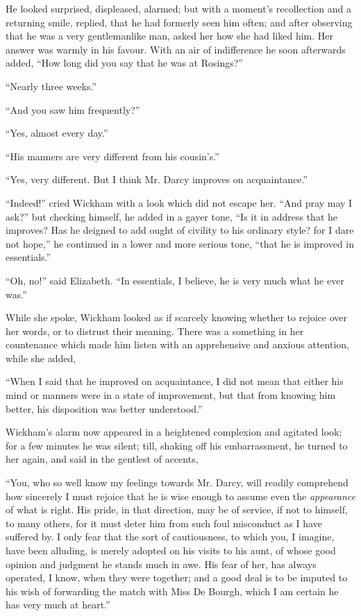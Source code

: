 He looked surprised, displeased, alarmed; but with
a moment’s recollection and a returning smile, replied,
that he had formerly seen him often; and after observing
that he was a very gentlemanlike man, asked her how she
had liked him. Her answer was warmly in his favour.
With an air of indifference he soon afterwards added,
“How long did you say that he was at Rosings?”

“Nearly three weeks.”

“And you saw him frequently?”

“Yes, almost every day.”

“His manners are very different from his cou\-sin’s.”

“Yes, very different. But I think Mr. Darcy improves
on acquaintance.”

“Indeed!” cried Wickham with a look which did not
escape her. “And pray may I ask?” but checking himself,
he added in a gayer tone, “Is it in address that he
improves? Has he deigned to add ought of civility to
his ordinary style? for I dare not hope,” he continued
in a lower and more serious tone, “that he is improved
in essentials.”

“Oh, no!” said Elizabeth. “In essentials, I believe,
he is very much what he ever was.”

While she spoke, Wickham looked as if scarcely knowing
whether to rejoice over her words, or to distrust their
meaning. There was a something in her countenance
which made him listen with an apprehensive and anxious
attention, while she added,

“When I said that he improved on acquaintance, I did
not mean that either his mind or manners were in a state
of improvement, but that from knowing him better, his
disposition was better understood.”

Wickham’s alarm now appeared in a heightened complexion
and agitated look; for a few minutes he was
silent; till, shaking off his embarrassment, he turned to
her again, and said in the gentlest of accents,

“You, who so well know my feelings towards Mr. Darcy,
will readily comprehend how sincerely I must rejoice that
he is wise enough to assume even the \textit{appearance} of what
is right. His pride, in that direction, may be of service,
if not to himself, to many others, for it must deter him
from such foul misconduct as I have suffered by. I only
fear that the sort of cautiousness, to which you, I imagine,
have been alluding, is merely adopted on his visits to his
aunt, of whose good opinion and judgment he stands
much in awe. His fear of her, has always operated,
I know, when they were together; and a good deal is to
be imputed to his wish of forwarding the match with
Miss De Bourgh, which I am certain he has very much
at heart.”

